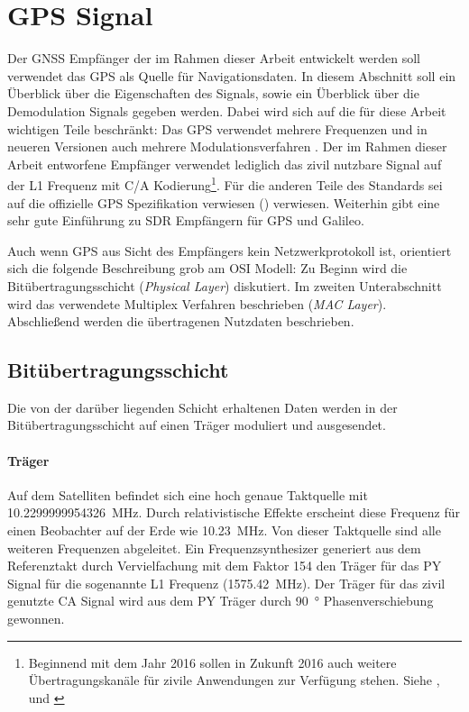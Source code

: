 \section{GPS Signal}
Der GNSS Empfänger der im Rahmen dieser Arbeit entwickelt werden soll verwendet das \gls{GPS} als Quelle für Navigationsdaten. In diesem Abschnitt soll ein Überblick über die Eigenschaften des Signals, sowie ein Überblick über die Demodulation Signals gegeben werden. Dabei wird sich auf die für diese Arbeit wichtigen Teile beschränkt: Das GPS verwendet mehrere Frequenzen und in neueren Versionen auch mehrere Modulationsverfahren \cite{specification2010gps}. Der im Rahmen dieser Arbeit entworfene Empfänger verwendet lediglich das zivil nutzbare Signal auf der L1 Frequenz mit C/A Kodierung\footnote{Beginnend mit dem Jahr 2016 sollen in Zukunft 2016 auch weitere Übertragungskanäle für zivile Anwendungen zur Verfügung stehen. Siehe \cite{interface1gps}, \cite{specification2010gps} und \cite{navstar2006space}}. Für die anderen Teile des Standards sei auf die offizielle GPS Spezifikation verwiesen (\cite{specification2010gps}) verwiesen. Weiterhin gibt \cite{borre2007software} eine sehr gute Einführung zu \gls{SDR} Empfängern für \gls{GPS} und Galileo. 

Auch wenn GPS aus Sicht des Empfängers kein Netzwerkprotokoll ist, orientiert sich die folgende Beschreibung grob am OSI Modell: Zu Beginn wird die Bitübertragungsschicht (\emph{Physical Layer}) diskutiert. Im zweiten Unterabschnitt wird das verwendete Multiplex Verfahren beschrieben (\emph{\gls{MAC} Layer}). Abschließend werden die übertragenen Nutzdaten beschrieben.

\subsection{Bitübertragungsschicht}
Die von der darüber liegenden Schicht erhaltenen Daten werden in der Bitübertragungsschicht auf einen Träger moduliert und ausgesendet. 

\paragraph{Träger} 
Auf dem Satelliten befindet sich eine hoch genaue Taktquelle mit \SI{10.2299999954326}{\MHz}. Durch relativistische Effekte erscheint diese Frequenz für einen Beobachter auf der Erde wie \SI{10.23}{\MHz}. Von dieser Taktquelle sind alle weiteren Frequenzen abgeleitet. Ein Frequenzsynthesizer generiert aus dem Referenztakt durch Vervielfachung mit dem Faktor 154 den Träger für das \gls{PY} Signal für die sogenannte L1 Frequenz (\SI{1575.42}{\MHz}). Der Träger für das zivil genutzte \gls{CA} Signal wird aus dem \gls{PY} Träger durch \SI{90}{\degree} Phasenverschiebung gewonnen.

